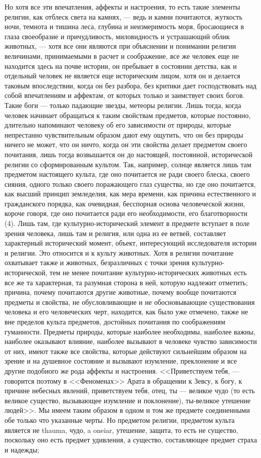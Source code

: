 \documentclass[12pt]{article}
\begin{document}
Но хотя все эти впечатления, аффекты и настроения, то есть такие элементы религии, как отблеск света на камнях, --- ведь и камни почитаются, жуткость ночи, темнота и тишина леса, глубина и неизмеримость моря, бросающиеся в глаза своеобразие и причудливость, миловидность и устрашающий облик животных, --- хотя все они являются при объяснении и понимании религии величинами, принимаемыми в расчет и соображение, все же человек еще не находится здесь на почве истории, он пребывает в состоянии детства, как и отдельный человек не является еще историческим лицом, хотя он и делается таковым впоследствии, когда он без разбора, без критики дает господствовать над собой впечатлениям и аффектам, от которых только и заимствует своих богов. Такие боги --- только падающие звезды, метеоры религии. Лишь тогда, когда человек начинает обращаться к таким свойствам предметов, которые постоянно, длительно напоминают человеку об его зависимости от природы, которые непрестанно чувствительным образом дают ему ощутить, что он без природы ничего не может, что он ничто, когда он эти свойства делает предметом своего почитания, лишь тогда возвышается он до настоящей, постоянной, исторической религии со сформированным культом. Так, например, солнце является лишь там предметом настоящего культа, где оно почитается не ради своего блеска, своего сияния, одного только своего поражающего глаз существа, но где оно почитается, как высший принцип земледелия, как мера времени, как причина естественного и гражданского порядка, как очевидная, бесспорная основа человеческой жизни, короче говоря, где оно почитается ради его необходимости, его благотворности (4). Лишь там, где культурно-исторический элемент в предмете вступает в поле зрения человека, лишь там и религия, или одна из ее ветвей, составляет характерный исторический момент, объект, интересующий исследователя истории и религии. Это относится и к культу животных. Хотя в религии почитание охватывает также и животных, безразличных с точки зрения культурно-исторической, тем не менее почитание культурно-исторических животных есть все же та характерная, та разумная сторона в ней, которую надлежит отметить; причина, почему почитаются другие животные, почему вообще почитаются предметы и свойства, не обусловливающие и не обосновывающие существования человека и его человеческих черт, находится, как было уже отмечено, также не вне пределов культа предметов, достойных почитания по соображениям гуманности. Предметы природы, которые наиболее необходимы, наиболее важны, наиболее оказывают влияние, наиболее вызывают в человеке чувство зависимости от них, имеют также все свойства, которые действуют сильнейшим образом на зрение и на душевное состояние и вызывают изумление, преклонение и все другие подобного же рода аффекты и настроения. <<Приветствуем тебя, --- говорится поэтому в <<Феноменах>> Арата в обращении к Зевсу, к богу, к причине небесных явлений, приветствуем тебя, отец, ты --- великое чудо (то есть великое существо, вызывающее изумление и поклонение), ты-великое утешение людей>>. Мы имеем таким образом в одном и том же предмете соединенными обе только что указанные черты. Но предметом религии, предметом культа является не thauma, чудо, a oneiar, утешение, защита, то есть не существо, поскольку оно есть предмет удивления, а существо, составляющее предмет страха и надежды; 
\end{document}
